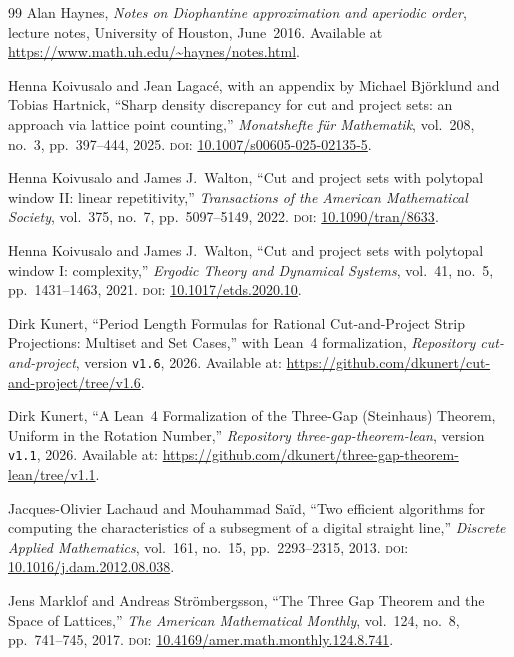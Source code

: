 \documentclass[11pt,reqno]{amsart}
\theoremstyle{plain}
\theoremstyle{definition}
\theoremstyle{remark}
\begin{document}
\begin{thebibliography}{99}
Alan Haynes,
\emph{Notes on Diophantine approximation and aperiodic order},
lecture notes, University of Houston, June~2016.
Available at \url{https://www.math.uh.edu/~haynes/notes.html}.

Henna Koivusalo and Jean Lagac\'e, with an appendix by Michael Bj\"orklund and
Tobias Hartnick,
``Sharp density discrepancy for cut and project sets: an approach via lattice point
counting,''
\emph{Monatshefte f\"ur Mathematik}, vol.~208, no.~3, pp.~397--444, 2025.
\textsc{doi}: \href{https://doi.org/10.1007/s00605-025-02135-5}%
{10.1007/s00605-025-02135-5}.

Henna Koivusalo and James J.\ Walton,
``Cut and project sets with polytopal window II: linear repetitivity,''
\emph{Transactions of the American Mathematical Society}, vol.~375, no.~7,
pp.~5097--5149, 2022.
\textsc{doi}: \href{https://doi.org/10.1090/tran/8633}{10.1090/tran/8633}.

Henna Koivusalo and James J.\ Walton,
``Cut and project sets with polytopal window I: complexity,''
\emph{Ergodic Theory and Dynamical Systems}, vol.~41, no.~5, pp.~1431--1463, 2021.
\textsc{doi}: \href{https://doi.org/10.1017/etds.2020.10}{10.1017/etds.2020.10}.

Dirk Kunert,
``Period Length Formulas for Rational Cut-and-Project Strip Projections:
Multiset and Set Cases,'' with Lean~4 formalization,
\emph{Repository cut-and-project}, version \texttt{v1.6}, 2026.\newline
Available at: \url{https://github.com/dkunert/cut-and-project/tree/v1.6}.

Dirk Kunert,
``A Lean~4 Formalization of the Three-Gap (Steinhaus) Theorem, Uniform in the
Rotation Number,''
\emph{Repository three-gap-theorem-lean}, version \texttt{v1.1}, 2026.\newline
Available at:
\url{https://github.com/dkunert/three-gap-theorem-lean/tree/v1.1}.

Jacques-Olivier Lachaud and Mouhammad Sa\"{i}d,
``Two efficient algorithms for computing the characteristics of a subsegment
of a digital straight line,''
\emph{Discrete Applied Mathematics}, vol.~161, no.~15, pp.~2293--2315, 2013.
\textsc{doi}: \href{https://doi.org/10.1016/j.dam.2012.08.038}%
{10.1016/j.dam.2012.08.038}.

Jens Marklof and Andreas Str\"{o}mbergsson,
``The Three Gap Theorem and the Space of Lattices,''
\emph{The American Mathematical Monthly}, vol.~124, no.~8, pp.~741--745,
2017.
\textsc{doi}: \href{https://doi.org/10.4169/amer.math.monthly.124.8.741}%
{10.4169/amer.math.monthly.124.8.741}.


\end{thebibliography}
\end{document}
